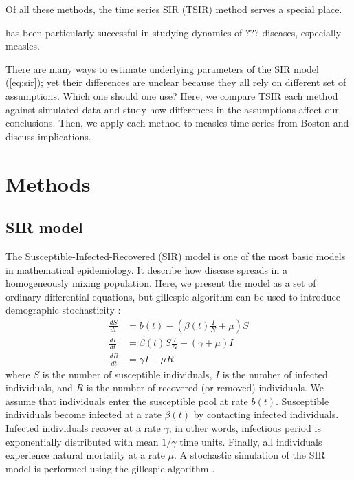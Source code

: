 \documentclass{article}
\newcommand{\eref}[1]{(\ref{eq:#1})}
\begin{document}
Of all these methods, the time series SIR (TSIR) method serves a special place.

has been particularly successful in studying dynamics of ??? diseases, especially measles.


There are many ways to estimate underlying parameters of the SIR model \eref{sir};
yet their differences are unclear because they all rely on different set of assumptions.
Which one should one use?
Here, we compare TSIR each method against simulated data and study how differences in the assumptions affect our conclusions.
Then, we apply each method to measles time series from Boston and discuss implications.

\section{Methods}

\subsection{SIR model}

The Susceptible-Infected-Recovered (SIR) model is one of the most basic models in mathematical epidemiology.
It describe how disease spreads in a homogeneously mixing population.
Here, we present the model as a set of ordinary differential equations, but gillespie algorithm can be used to introduce demographic stochasticity \citep{gillespie1976general}:
\begin{equation}\label{eq:sir}
\begin{aligned}
\frac{dS}{dt} &= b(t) - \left(\beta(t) \frac{I}{N} + \mu \right) S\\
\frac{dI}{dt} &= \beta(t) S \frac{I}{N} - (\gamma + \mu) I\\
\frac{dR}{dt} &= \gamma I - \mu R
\end{aligned}
\end{equation}
where $S$ is the number of susceptible individuals, $I$ is the number of infected individuals, and $R$ is the number of recovered (or removed) individuals.
We assume that individuals enter the susceptible pool at rate $b(t)$.
Susceptible individuals become infected at a rate $\beta(t)$ by contacting infected individuals.
Infected individuals recover at a rate $\gamma$;
in other words, infectious period is exponentially distributed with mean $1/\gamma$ time units.
Finally, all individuals experience natural mortality at a rate $\mu$.
A stochastic simulation of the SIR model is performed using the gillespie algorithm \citep{gillespie1976general}.
\end{document}
